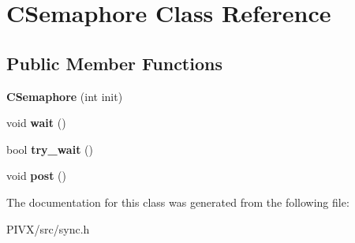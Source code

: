 \hypertarget{class_c_semaphore}{}\section{C\+Semaphore Class Reference}
\label{class_c_semaphore}
\subsection*{Public Member Functions}
\begin{DoxyCompactItemize}
\item 
\mbox{\label{class_c_semaphore_ac9cc749c7424852d7fb4378811d0dae1}} 
{\bfseries C\+Semaphore} (int init)
\item 
\mbox{\label{class_c_semaphore_a1c108bd981fe68527ec8ef5e7b0d116c}} 
void {\bfseries wait} ()
\item 
\mbox{\label{class_c_semaphore_abb8a07e6cac29dc72f044cd536a9f9e5}} 
bool {\bfseries try\+\_\+wait} ()
\item 
\mbox{\label{class_c_semaphore_af6a956f6c191e824485fd3af6db39318}} 
void {\bfseries post} ()
\end{DoxyCompactItemize}


The documentation for this class was generated from the following file\+:\begin{DoxyCompactItemize}
\item 
P\+I\+V\+X/src/sync.\+h\end{DoxyCompactItemize}
